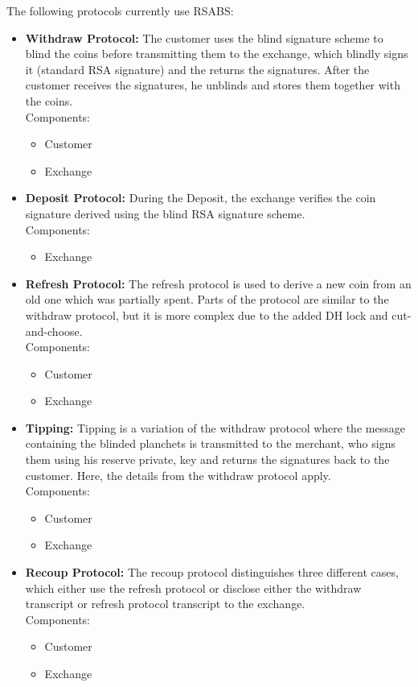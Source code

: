The following protocols currently use \gls{RSABS}:
\begin{itemize}
    \item \textbf{Withdraw Protocol:}
          The customer uses the blind signature scheme to blind the coins before transmitting them to the exchange, which blindly signs it (standard RSA signature) and the returns the signatures.
          After the customer receives the signatures, he unblinds and stores them together with the coins.
          \\ Components:
          \begin{itemize}
              \item Customer
              \item Exchange
          \end{itemize}
    \item \textbf{Deposit Protocol:}
          During the Deposit, the exchange verifies the coin signature derived using the blind RSA signature scheme.
          \\ Components:
          \begin{itemize}
              \item Exchange
          \end{itemize}
    \item \textbf{Refresh Protocol:}
          The refresh protocol is used to derive a new coin from an old one which was partially spent.
          Parts of the protocol are similar to the withdraw protocol, but it is more complex due to the added DH lock and cut-and-choose.
          \\ Components:
          \begin{itemize}
              \item Customer
              \item Exchange
          \end{itemize}
    \item \textbf{Tipping:}
          Tipping is a variation of the withdraw protocol where the message containing the blinded planchets is transmitted to the merchant, who signs them using his reserve private, key and returns the signatures back to the customer.
          Here, the details from the withdraw protocol apply.
          \\ Components:
          \begin{itemize}
              \item Customer
              \item Exchange
          \end{itemize}
    \item \textbf{Recoup Protocol:}
          The recoup protocol distinguishes three different cases, which either use the refresh protocol or disclose either the withdraw transcript or refresh protocol transcript to the exchange.
          \\ Components:
          \begin{itemize}
              \item Customer
              \item Exchange
          \end{itemize}
\end{itemize}


